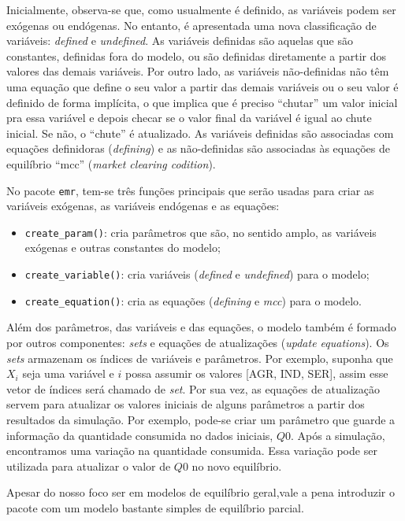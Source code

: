 \documentclass[12pt,twoside]{article}
\begin{document}
Inicialmente, observa-se que, como usualmente é definido, as variáveis
podem ser exógenas ou endógenas. No entanto, é apresentada uma nova
classificação de variáveis: \emph{defined} e \emph{undefined}. As
variáveis definidas são aquelas que são constantes, definidas fora do
modelo, ou são definidas diretamente a partir dos valores das demais
variáveis. Por outro lado, as variáveis não-definidas não têm uma
equação que define o seu valor a partir das demais variáveis ou o seu
valor é definido de forma implícita, o que implica que é preciso
``chutar'' um valor inicial pra essa variável e depois checar se o valor
final da variável é igual ao chute inicial. Se não, o ``chute'' é
atualizado. As variáveis definidas são associadas com equações
definidoras (\emph{defining}) e as não-definidas são associadas às
equações de equilíbrio ``mcc'' (\emph{market clearing codition}).

No pacote \texttt{emr}, tem-se três funções principais que serão usadas
para criar as variáveis exógenas, as variáveis endógenas e as equações:

\begin{itemize}
\item
  \texttt{create\_param()}: cria parâmetros que são, no sentido amplo,
  as variáveis exógenas e outras constantes do modelo;
\item
  \texttt{create\_variable()}: cria variáveis (\emph{defined} e
  \emph{undefined}) para o modelo;
\item
  \texttt{create\_equation()}: cria as equações (\emph{defining} e
  \emph{mcc}) para o modelo.
\end{itemize}

Além dos parâmetros, das variáveis e das equações, o modelo também é
formado por outros componentes: \emph{sets} e equações de atualizações
(\emph{update equations}). Os \emph{sets} armazenam os índices de
variáveis e parâmetros. Por exemplo, suponha que \(X_i\) seja uma
variável e \(i\) possa assumir os valores {[}AGR, IND, SER{]}, assim
esse vetor de índices será chamado de \emph{set}. Por sua vez, as
equações de atualização servem para atualizar os valores iniciais de
alguns parâmetros a partir dos resultados da simulação. Por exemplo,
pode-se criar um parâmetro que guarde a informação da quantidade
consumida no dados iniciais, \(Q0\). Após a simulação, encontramos uma
variação na quantidade consumida. Essa variação pode ser utilizada para
atualizar o valor de \(Q0\) no novo equilíbrio.

Apesar do nosso foco ser em modelos de equilíbrio geral,vale a pena
introduzir o pacote com um modelo bastante simples de equilíbrio
parcial.
\end{document}
